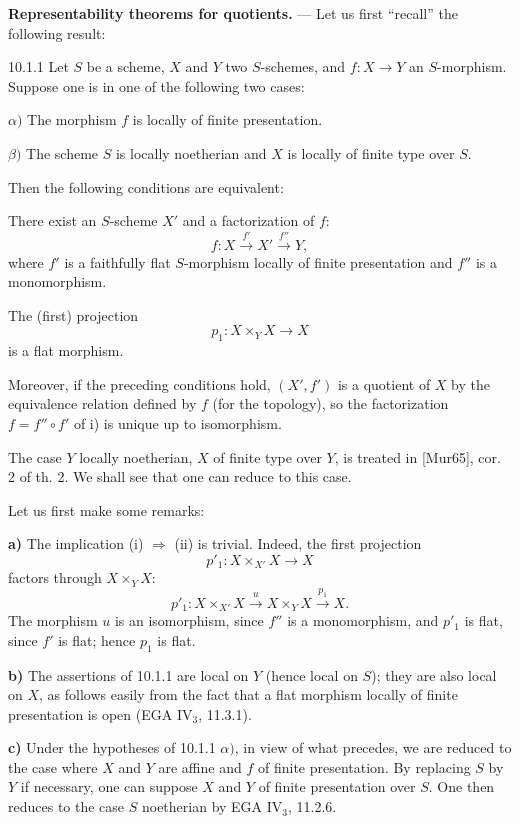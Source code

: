 \textbf{Representability theorems for quotients.} --- Let us first ``recall'' the following result:
\begin{theorem}{10.1.1}\label{V.10.1.1}
Let $S$ be a scheme, $X$ and $Y$ two $S$-schemes, and $f:X\to Y$ an $S$-morphism. Suppose one is in one of the following two cases:

$\alpha)$ The morphism $f$ is locally of finite presentation.

$\beta)$ The scheme $S$ is locally noetherian and $X$ is locally of finite type over $S$.

Then the following conditions are equivalent:
\begin{enumeratei}
\item There exist an $S$-scheme $X'$ and a factorization of $f$:
\[
f:X\xrightarrow{f'}X'\xrightarrow{f''}Y,
\]
where $f'$ is a faithfully flat $S$-morphism locally of finite presentation and $f''$ is a monomorphism.
\item The (first) projection
\[
p_1:X\times_YX\to X
\]
is a flat morphism.
\end{enumeratei}
Moreover, if the preceding conditions hold, $(X',f')$ is a quotient of $X$ by the equivalence relation defined by $f$ (for the \fppf topology), so the factorization $f=f''\circ f'$ of i) is unique up to isomorphism.
\end{theorem}
The case $Y$ locally noetherian, $X$ of finite type over $Y$, is treated in [Mur65], cor. 2 of th. 2. We shall see that one can reduce to this case.

Let us first make some remarks:

\textbf{a)} The implication (i) $\Rightarrow$ (ii) is trivial. Indeed, the first projection
\[
p'_1:X\times_{X'}X\to X
\]
factors through $X\times_YX$:
\[
p'_1:X\times_{X'}X\xrightarrow{u}X\times_YX\xrightarrow{p_1}X.
\]
The morphism $u$ is an isomorphism, since $f''$ is a monomorphism, and $p'_1$ is flat, since $f'$ is flat; hence $p_1$ is flat.

\textbf{b)} The assertions of 10.1.1 are local on $Y$ (hence local on $S$); they are also local on $X$, as follows easily from the fact that a flat morphism locally of finite presentation is open (EGA IV$_3$, 11.3.1).

\textbf{c)} Under the hypotheses of 10.1.1 $\alpha)$, in view of what precedes, we are reduced to the case where $X$ and $Y$ are affine and $f$ of finite presentation. By replacing $S$ by $Y$ if necessary, one can suppose $X$ and $Y$ of finite presentation over $S$. One then reduces to the case $S$ noetherian by EGA IV$_3$, 11.2.6.


